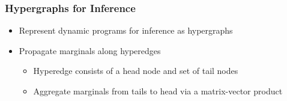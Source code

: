 \documentclass{beamer}
\begin{document}
\begin{frame}
\frametitle{Hypergraphs for Inference}
\begin{itemize}
\item Represent dynamic programs for inference as hypergraphs
\vspace{1em}
\item Propagate marginals along hyperedges
    \begin{itemize}
    \item Hyperedge consists of a head node and set of tail nodes
    \item Aggregate marginals from tails to head via a matrix-vector product
    \end{itemize}
\end{itemize}
\begin{columns}

\begin{column}{0.5\textwidth}
\begin{center}
\end{center}
\end{column}

\begin{column}{0.5\textwidth}
\begin{center}
\end{center}
\end{column}
\end{columns}
\end{frame}
\end{document}
